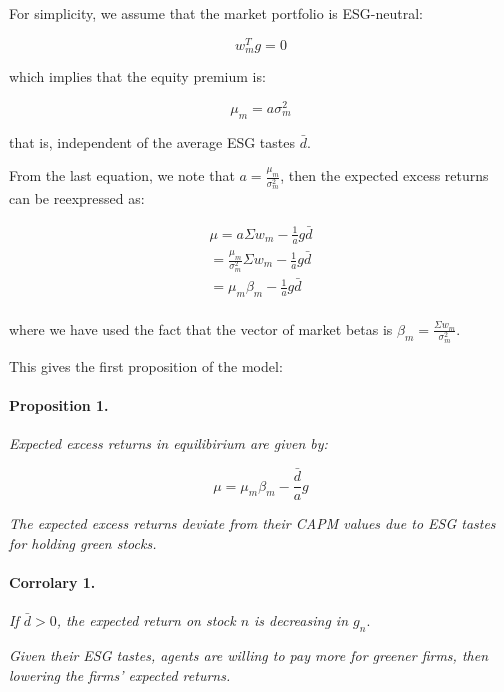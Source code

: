 For simplicity, we assume that the market portfolio is ESG-neutral:

\begin{equation}
    w_m^T g = 0
\end{equation}

which implies that the equity premium is:

\begin{equation}
    \mu_m = a \sigma_m^2
\end{equation}

that is, independent of the average ESG tastes $\bar{d}$.

From the last equation, we note that $a = \frac{\mu_m}{\sigma_m^2}$, then 
the expected excess returns can be reexpressed as: 

\begin{equation}
    \begin{aligned}
        \mu = a \Sigma w_m - \frac{1}{a} g \bar{d} \\
        = \frac{\mu_m}{\sigma_m^2} \Sigma w_m - \frac{1}{a} g \bar{d} \\
        = \mu_m \beta_m - \frac{1}{a} g \bar{d} \\
    \end{aligned}
\end{equation}

where we have used the fact that the 
vector of market betas is $\beta_m = \frac{\Sigma w_m}{\sigma_m^2}$.

This gives the first proposition of the model:

\paragraph{Proposition 1.}
\textit{Expected excess returns in equilibirium are given by:}

\begin{equation}
    \mu = \mu_m \beta_m - \frac{\bar{d}}{a} g 
\end{equation}

\textit{
The expected excess returns deviate from their CAPM values due to ESG 
tastes for holding green stocks.}

\paragraph{Corrolary 1.}
\textit{If $\bar{d} > 0$, the expected return on stock $n$ is decreasing in $g_n$}.

\textit{Given their ESG tastes, agents are willing to pay more for greener firms, then 
lowering the firms' expected returns.}

